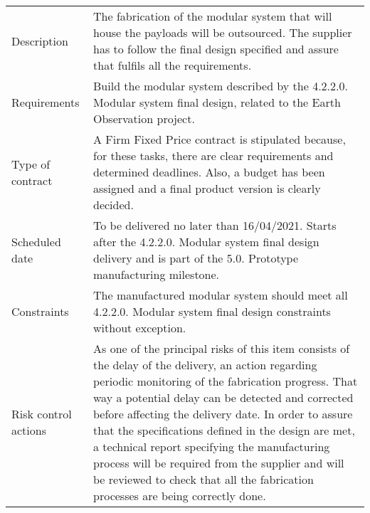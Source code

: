 \begin{table}[H]
	\centering
	\begin{tabular}{>{\raggedright\arraybackslash}p{3cm} >{\arraybackslash}p{11cm}}
		
		\toprule[2pt]
		
		\multicolumn{2}{c}{\textbf{SOW - 5.1.2. Manufacturing of modular system}}\\
		
		\midrule[1.5pt]
		
		Description & The fabrication of the modular system that will house the payloads will be outsourced. The supplier has to follow the final design specified and assure that fulfils all the requirements.\vspace{0.2cm} \\
		
		\midrule
		
		Requirements & Build the modular system described by the 4.2.2.0. Modular system final design, related to the Earth Observation project.\vspace{0.2cm} \\
		
		\midrule
		
		Type of contract & A Firm Fixed Price contract is stipulated because, for these tasks, there are clear requirements and determined deadlines. Also, a budget has been assigned and a final product version is clearly decided.\vspace{0.2cm} \\
		
		\midrule
		
		Scheduled date & To be delivered no later than 16/04/2021. Starts after the 4.2.2.0. Modular system final design delivery and is part of the 5.0. Prototype manufacturing milestone.\vspace{0.2cm} \\
		
		\midrule
		
		Constraints & The manufactured modular system should meet all 4.2.2.0. Modular system final design constraints without exception.\vspace{0.2cm} \\
		
		\midrule
		
		Risk control actions & As one of the principal risks of this item consists of the delay of the delivery, an action regarding periodic monitoring of the fabrication progress. That way a potential delay can be detected and corrected before affecting the delivery date.
		In order to assure that the specifications defined in the design are met, a technical report specifying the manufacturing process will be required from the supplier and will be reviewed to check that all the fabrication processes are being correctly done.\vspace{0.2cm} \\
		

\end{tabular}
\end{table}
